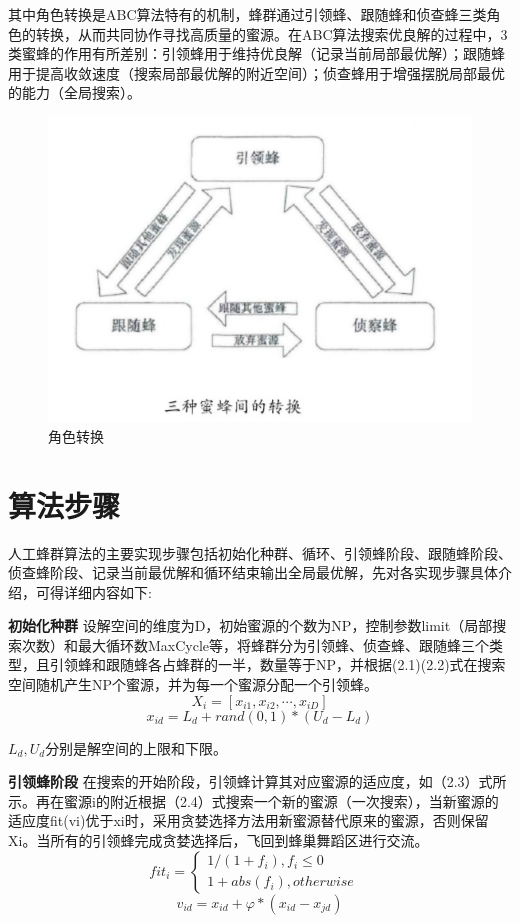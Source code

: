 \documentclass[a4paper,12pt]{report}
\begin{document}
\begin{spacing}{1.5}
	其中角色转换是ABC算法特有的机制，蜂群通过引领蜂、跟随蜂和侦查蜂三类角色的转换，从而共同协作寻找高质量的蜜源。在ABC算法搜索优良解的过程中，3类蜜蜂的作用有所差别：引领蜂用于维持优良解（记录当前局部最优解）；跟随蜂用于提高收敛速度（搜索局部最优解的附近空间）；侦查蜂用于增强摆脱局部最优的能力（全局搜索）。
		\begin{figure}[htbp]
			\centering
			\includegraphics[width=.6\textwidth]{pic/bee5.png}
			\caption{角色转换}
			\label{fig:pt2}
		\end{figure}

\section{算法步骤}

		人工蜂群算法的主要实现步骤包括初始化种群、循环、引领蜂阶段、跟随蜂阶段、侦查蜂阶段、记录当前最优解和循环结束输出全局最优解，先对各实现步骤具体介绍，可得详细内容如下:

		{\bfseries 初始化种群} \quad 设解空间的维度为D，初始蜜源的个数为NP，控制参数limit（局部搜索次数）和最大循环数MaxCycle等，将蜂群分为引领蜂、侦查蜂、跟随蜂三个类型，且引领蜂和跟随蜂各占蜂群的一半，数量等于NP，并根据(2.1)(2.2)式在搜索空间随机产生NP个蜜源，并为每一个蜜源分配一个引领蜂。
			\begin{equation}
				X_{i} = [ x_{i1},x_{i2},\cdots,x_{iD}]
			\end{equation}
			\begin{equation}
				x_{id} = L_{d} + rand(0,1) * (U_{d} - L_{d})
			\end{equation}

			$L_{d},U_{d}$分别是解空间的上限和下限。

		{\bfseries 引领蜂阶段} \quad 在搜索的开始阶段，引领蜂计算其对应蜜源的适应度，如（2.3）式所示。再在蜜源i的附近根据（2.4）式搜索一个新的蜜源（一次搜索），当新蜜源的适应度fit(vi)优于xi时，采用贪婪选择方法用新蜜源替代原来的蜜源，否则保留Xi。当所有的引领蜂完成贪婪选择后，飞回到蜂巢舞蹈区进行交流。
			\begin{equation}
				fit_{i} = \left\{  
	             		\begin{array}{lr}  
	             			1 / (1 + f_{i}),f_{i} \leq 0 &  \\  
	             			1 + abs(f_{i}), otherwise    
	             		\end{array}  
	           		\right.
			\end{equation}
			\begin{equation}
				v_{id} = x_{id} + \varphi * (x_{id} - x_{jd})
			\end{equation}


\end{spacing}
\end{document}
